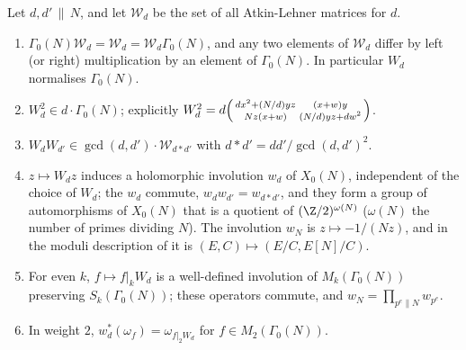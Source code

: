 \begin{proposition}\label{prop:modforms:atkin-lehner}
Let $d,d'\,\|\,N$, and let $\mathcal W_d$ be the set of all Atkin-Lehner matrices for $d$.
\begin{enumerate}[label=(\roman*)]
\item $\Gamma_0(N)\mathcal W_d=\mathcal W_d=\mathcal W_d\Gamma_0(N)$, and any two elements of $\mathcal W_d$ differ by left (or right) multiplication by an element of $\Gamma_0(N)$. In particular $W_d$
normalises $\Gamma_0(N)$.
\item $W_d^2\in d\cdot\Gamma_0(N)$; explicitly $W_d^2=d\begin{psmallmatrix}dx^2+(N/d)yz&(x+w)y\\Nz(x+w)&(N/d)yz+dw^2\end{psmallmatrix}$.
\item $W_dW_{d'}\in\gcd(d,d')\cdot\mathcal W_{d*d'}$ with $d*d'=dd'/\gcd(d,d')^2$.
\item $z\mapsto W_dz$ induces a holomorphic involution $w_d$ of $X_0(N)$, independent of the choice of $W_d$; the $w_d$ commute, $w_dw_{d'}=w_{d*d'}$, and they form a group of automorphisms
of $X_0(N)$ that is a quotient of $(\Z/2)^{\omega(N)}$ ($\omega(N)$ the number of primes dividing $N$). The involution $w_N$ is $z\mapsto-1/(Nz)$, and in the moduli description
of  it is $(E,C)\mapsto(E/C,E[N]/C)$.
\item For even $k$, $f\mapsto f|_kW_d$ is a well-defined involution of $M_k(\Gamma_0(N))$ preserving $S_k(\Gamma_0(N))$; these operators commute, and $w_N=\prod_{p^e\|N}w_{p^e}$.
\item In weight $2$, $w_d^*(\omega_f)=\omega_{f|_2W_d}$ for $f\in M_2(\Gamma_0(N))$.
\end{enumerate}
\end{proposition}

